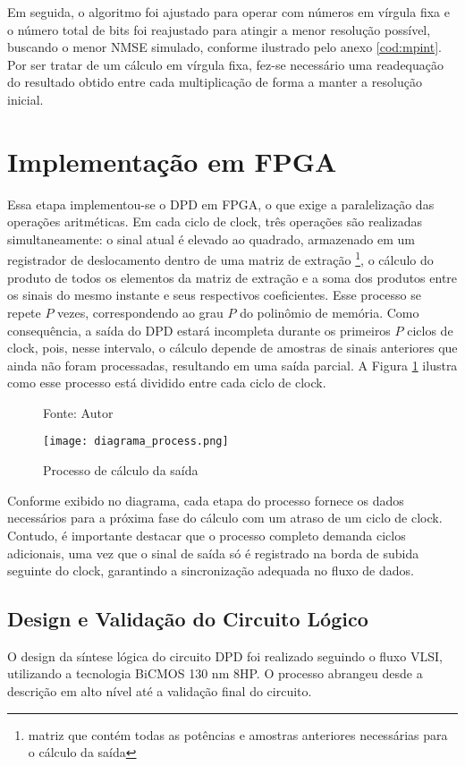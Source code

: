Em seguida, o algoritmo foi ajustado para operar com números em vírgula fixa e o número total de bits foi reajustado para atingir a menor resolução possível, buscando o menor NMSE simulado, conforme ilustrado pelo anexo \ref{cod:mpint}. Por ser tratar de um cálculo em vírgula fixa, fez-se necessário uma readequação do resultado obtido entre cada multiplicação de forma a manter a resolução inicial.

\section{Implementação em FPGA}
Essa etapa implementou-se o DPD em FPGA, o que exige a paralelização das operações aritméticas. Em cada ciclo de clock, três operações são realizadas simultaneamente: o sinal atual é elevado ao quadrado, armazenado em um registrador de deslocamento dentro de uma matriz de extração \footnote{matriz que contém todas as potências e amostras anteriores necessárias para o cálculo da saída}, o cálculo do produto de todos os elementos da matriz de extração e a soma dos produtos entre os sinais do mesmo instante e seus respectivos coeficientes. Esse processo se repete \( P \) vezes, correspondendo ao grau \( P \) do polinômio de memória. Como consequência, a saída do DPD estará incompleta durante os primeiros \( P \) ciclos de clock, pois, nesse intervalo, o cálculo depende de amostras de sinais anteriores que ainda não foram processadas, resultando em uma saída parcial.
 A Figura \ref{fig:diagramaprocess} ilustra como esse processo está dividido entre cada ciclo de clock.
 
\begin{figure}[htbp!]
  \centering
  \captionsetup{justification=centering}
  \caption*{Fonte: Autor}
  \texttt{[image: diagrama\_process.png]}
  \caption{Processo de cálculo da saída}
  \label{fig:diagramaprocess}
\end{figure}
Conforme exibido no diagrama, cada etapa do processo fornece os dados necessários para a próxima fase do cálculo com um atraso de um ciclo de clock. Contudo, é importante destacar que o processo completo demanda ciclos adicionais, uma vez que o sinal de saída só é registrado na borda de subida seguinte do clock, garantindo a sincronização adequada no fluxo de dados.

\subsection{Design e Validação do Circuito Lógico}  
O design da síntese lógica do circuito DPD foi realizado seguindo o fluxo VLSI, utilizando a tecnologia BiCMOS 130 nm 8HP. O processo abrangeu desde a descrição em alto nível até a validação final do circuito.  

